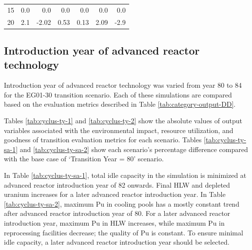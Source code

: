 \begin{table}[H]
\begin{tabularx}{\textwidth}{R|RRRRRR}
        15 & 0.0              & 0.0                            & 0.0           & 0.0                         & 0.0               & 0.0                             \\
        20 & 2.1              & -2.02                          & 0.53          & 0.13                        & 2.09              & -2.9                           \\ \hline
                           \end{tabularx}%
    
    \end{table}


\subsection{Introduction year of advanced reactor technology}
Introduction year of advanced reactor technology
was varied from year 80 to 84 for the \Cyclus 
EG01-30 transition scenario. 
Each of these simulations are compared based on the evaluation 
metrics described in Table \ref{tab:category-output-DD}.

Tables \ref{tab:cyclus-ty-1} and \ref{tab:cyclus-ty-2} show 
the absolute values of 
output variables associated with the environmental impact, 
resource utilization, and goodness of transition evaluation 
metrics for each scenario. 
Tables \ref{tab:cyclus-ty-sa-1} and \ref{tab:cyclus-ty-sa-2} 
show each scenario's percentage 
difference compared with the base case of `Transition Year = 80'
scenario. 

In Table \ref{tab:cyclus-ty-sa-1}, total idle capacity 
in the simulation is minimized at advanced reactor 
introduction year of 82 onwards. 
Final HLW and depleted uranium increases for a later 
advanced reactor introduction year.
In Table \ref{tab:cyclus-ty-sa-2}, maximum Pu in cooling 
pools has a mostly constant trend after advanced reactor 
introduction year of 80. 
For a later advanced reactor introduction year, 
maximum Pu in HLW increases, while maximum Pu in reprocessing facilities 
decrease; the quality of Pu is constant. 
To ensure minimal idle capacity, a later advanced reactor 
introduction year should be selected. 

